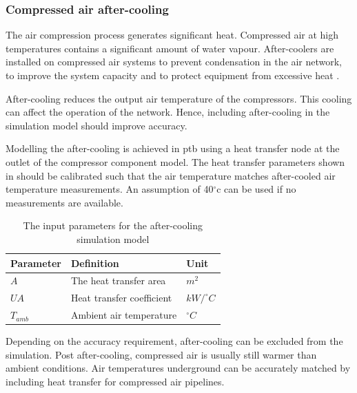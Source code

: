 		\subsubsection{Compressed air after-cooling}
		The air compression process generates significant heat. Compressed air at high temperatures contains a significant amount of water vapour. After-coolers are installed on compressed air systems to prevent condensation in the air network, to improve the system capacity and to protect equipment from excessive heat \cite{schroeder2009energy}.
		\par 
		After-cooling reduces the output air temperature of the compressors. This cooling can affect the operation of the network. Hence, including after-cooling in the simulation model should improve accuracy.
		\par
		Modelling the after-cooling is achieved in \gls{ptb} using a heat transfer node at the outlet of the compressor component model. The heat transfer parameters shown in  should be calibrated such that the air temperature matches after-cooled air temperature measurements. An assumption of 40$^\circ$\gls{c} can be used if no measurements are available.
		\begin{table}
			\caption{The input parameters for the after-cooling simulation model}
			\centering
			\begin{tabular}{lll}
				\hline 
				Parameter \hspace{1cm} & Definition \hspace{4cm} & Unit \\
				\hline
				$A$ & The heat transfer area & $m^2$ \\
				$UA$ & Heat transfer coefficient & $kW/^{\circ} C$ \\
				$T_{amb}$ & Ambient air temperature & $^{\circ} C$ \\
				\hline
			\end{tabular}
		\label{table: After cooling inputs}
		\end{table}
	Depending on the accuracy requirement, after-cooling can be excluded from the simulation. Post after-cooling, compressed air is usually still warmer than ambient conditions. Air temperatures underground can be accurately matched by including heat transfer for compressed air pipelines.
	
